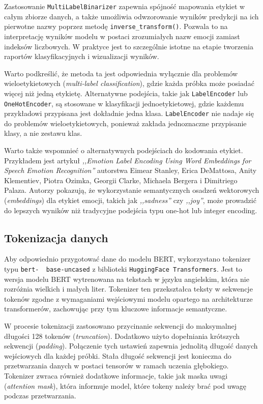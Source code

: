 \documentclass[wmii, inf, mgr]{uwmthesis}
\begin{document}
Zastosowanie \texttt{MultiLabelBinarizer} zapewnia spójność mapowania etykiet w całym zbiorze danych, a także umożliwia odwzorowanie wyników predykcji na ich pierwotne nazwy poprzez metodę \texttt{inverse\_transform()}. Pozwala to na interpretację wyników modelu w postaci zrozumiałych nazw emocji zamiast indeksów liczbowych. W praktyce jest to szczególnie istotne na etapie tworzenia raportów klasyfikacyjnych i wizualizacji wyników.

Warto podkreślić, że metoda ta jest odpowiednia wyłącznie dla problemów wieloetykietowych (\textit{multi-label classification}), gdzie każda próbka może posiadać więcej niż jedną etykietę. Alternatywne podejścia, takie jak \texttt{LabelEncoder} lub \texttt{OneHotEncoder}, są stosowane w klasyfikacji jednoetykietowej, gdzie każdemu przykładowi przypisana jest dokładnie jedna klasa. \texttt{LabelEncoder} nie nadaje się do problemów wieloetykietowych, ponieważ zakłada jednoznaczne przypisanie klasy, a nie zestawu klas. 

Warto także wspomnieć o alternatywnych podejściach do kodowania etykiet. Przykładem jest artykuł \textit{,,Emotion Label Encoding Using Word Embeddings for Speech Emotion Recognition''} \cite{Interspeech} autorstwa Eimear Stanley, Erica DeMattosa, Anity Klementiev, Piotra Ozimka, Georgii Clarke, Michaela Bergera i Dimitriego Palaza. Autorzy pokazują, że wykorzystanie semantycznych osadzeń wektorowych (\textit{embeddings}) dla etykiet emocji, takich jak \textit{,,sadness''} czy \textit{,,joy''}, może prowadzić do lepszych wyników niż tradycyjne podejścia typu one-hot lub integer encoding.


\subsection{Tokenizacja danych}
Aby odpowiednio przygotować dane do modelu BERT, wykorzystano tokenizer typu \texttt{bert- ~base-uncased} z biblioteki \texttt{HuggingFace Transformers}. Jest to wersja modelu BERT wytrenowana na tekstach w języku angielskim, która nie rozróżnia wielkich i małych liter. Tokenizer ten przekształca teksty w sekwencje tokenów zgodne z wymaganiami wejściowymi modelu opartego na architekturze transformerów, zachowując przy tym kluczowe informacje semantyczne.

W procesie tokenizacji zastosowano przycinanie sekwencji do maksymalnej długości 128 tokenów (\textit{truncation}). Dodatkowo użyto dopełniania krótszych sekwencji (\textit{padding}). Połączenie tych ustawień zapewnia jednolitą długość danych wejściowych dla każdej próbki. Stała długość sekwencji jest konieczna do przetwarzania danych w postaci tensorów w ramach uczenia głębokiego. Tokenizer zwraca również dodatkowe informacje, takie jak maska uwagi (\textit{attention mask}), która informuje model, które tokeny należy brać pod uwagę podczas przetwarzania.
\end{document}
